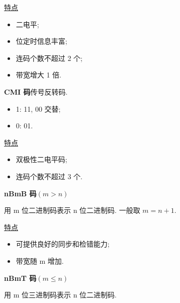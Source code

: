 \underline{特点}
\begin{itemize}
    \item 二电平;
    \item 位定时信息丰富;
    \item 连码个数不超过 2 个;
    \item 带宽增大 1 倍.
\end{itemize}

\textbf{CMI 码}\quad 传号反转码.
\begin{itemize}
    \item 1: 11, 00 交替;
    \item 0: 01.
\end{itemize}

\underline{特点}
\begin{itemize}
    \item 双极性二电平码;
    \item 连码个数不超过 3 个.
\end{itemize}

\textbf{nBmB 码}\quad $(m>n)$

用 m 位二进制码表示 n 位二进制码. 一般取 $m=n+1$.

\underline{特点}
\begin{itemize}
    \item 可提供良好的同步和检错能力;
    \item 带宽随 m 增加.
\end{itemize}

\textbf{nBmT 码}\quad $(m\leq n)$

用 m 位三进制码表示 n 位二进制码.
